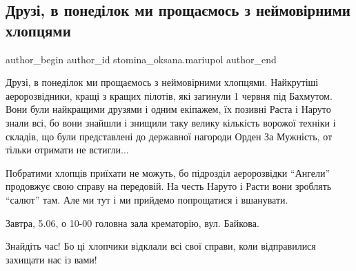  
 
 
 
 

\subsection{Друзі, в понеділок ми прощаємось з неймовірними хлопцями}
\label{sec:04_06_2023.fb.stomina_oksana.mariupol.1.druzi_v_ponedilok_my_proschajemos_z_nejmovirnymy_hlopcjamy}

\ifcmt
 author_begin
   author_id stomina_oksana.mariupol
 author_end
\fi

Друзі, в понеділок ми прощаємось з неймовірними хлопцями. Найкрутіші
аеророзвідники, кращі з кращих пілотів, які загинули 1 червня під Бахмутом.
Вони були найкращими друзями і одним екіпажем, їх позивні Раста і Наруто знали
всі, бо вони знайшли і знищили таку велику кількість ворожої техніки і складів,
що були представлені до державної нагороди Орден За Мужність, от тільки
отримати не встигли... 

Побратими хлопців приїхати не можуть, бо підрозділ аеророзвідки
\enquote{Ангели} продовжує свою справу на передовій. На честь Наруто і Расти
вони зроблять \enquote{салют} там. Але  ми тут і ми прийдемо попрощатися і
вшанувати. 

Завтра, 5.06, о 10-00 головна зала крематорію, вул. Байкова.

Знайдіть час! Бо ці хлопчики відклали всі свої справи, коли відправилися
захищати нас із вами!
